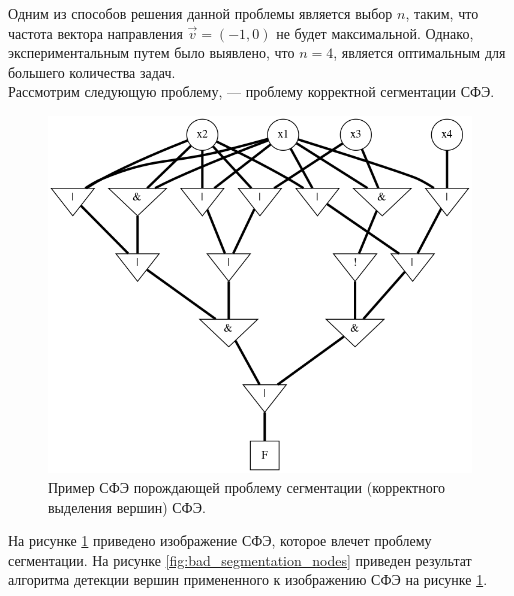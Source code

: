 \documentclass[makeidx, a4paper, 14pt]{extarticle}
\begin{document}
Одним из способов решения данной проблемы является выбор $n$, таким, что частота вектора направления $\vec{v}=(-1, 0)$ не будет максимальной.
Однако, экспериментальным путем было выявлено, что $n=4$, является оптимальным для большего количества задач. \\

Рассмотрим следующую проблему, --- проблему корректной сегментации СФЭ.

\begin{figure}[H]
    \centering
    \includegraphics[scale=0.4]{bad_segmentation.png}
    \caption{Пример СФЭ порождающей проблему сегментации (корректного выделения вершин) СФЭ.}
    \label{fig:bad_segmentation}
\end{figure}

На рисунке \ref{fig:bad_segmentation} приведено изображение СФЭ, которое влечет проблему сегментации.
На рисунке \ref{fig:bad_segmentation_nodes} приведен результат алгоритма детекции вершин примененного к изображению СФЭ на рисунке \ref{fig:bad_segmentation}.
\end{document}
